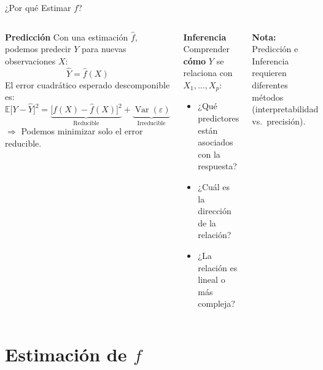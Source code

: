 \documentclass[aspectratio=169, 10pt]{beamer}
\newcommand{\E}{\mathbb{E}}
\newcommand{\Var}{\operatorname{Var}}
\begin{document}
\begin{frame}{¿Por qué Estimar $f$?}
  \begin{columns}[T]
    \begin{block}{\textbf{Predicción}}
      \small
      Con una estimación $\hat{f}$, podemos predecir $Y$ para nuevas
      observaciones $X$:
      \[\hat{Y} = \hat{f}(X)\]
      El error cuadrático esperado descomponible es:
      \[
        \E\bigl[Y - \hat{Y}\bigr]^2 = 
        \underbrace{\bigl[f(X) - \hat{f}(X)\bigr]^2}_{\text{Reducible}} 
        + \underbrace{\Var(\varepsilon)}_{\text{Irreducible}}
      \]
      \vspace{0.2cm}
      $\Rightarrow$ Podemos minimizar solo el error \alert{reducible}.
    \end{block}
    \begin{block}{\textbf{Inferencia}}
      \small
      Comprender \textbf{cómo} $Y$ se relaciona con $X_1, \ldots, X_p$:
      \begin{itemize}
        \item ¿Qué predictores están \alert{asociados} con la respuesta?
        \item ¿Cuál es la \alert{dirección} de la relación?
        \item ¿La relación es \alert{lineal} o más compleja?
      \end{itemize}
    \end{block}

    \vspace{0.3cm}
    \begin{tcolorbox}[colback=AccentBlue!10, colframe=AccentBlue, arc=4pt,
                      boxsep=1pt, left=5pt, right=5pt, top=3pt, bottom=3pt]
      \small\textbf{Nota:} Predicción e Inferencia requieren diferentes
      métodos (interpretabilidad vs.\ precisión).
    \end{tcolorbox}
  \end{columns}
\end{frame}

\section{Estimación de $f$}
\end{document}
